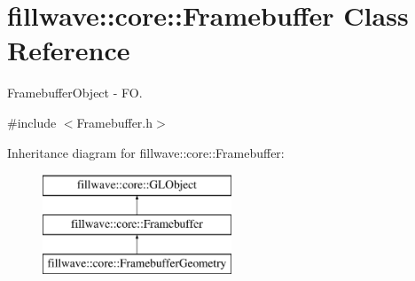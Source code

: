 \hypertarget{classfillwave_1_1core_1_1Framebuffer}{}\section{fillwave\+:\+:core\+:\+:Framebuffer Class Reference}
\label{classfillwave_1_1core_1_1Framebuffer}


Framebuffer\+Object -\/ F\+O.  




{\ttfamily \#include $<$Framebuffer.\+h$>$}

Inheritance diagram for fillwave\+:\+:core\+:\+:Framebuffer\+:\begin{figure}[H]
\begin{center}
\leavevmode
\includegraphics[height=3.000000cm]{classfillwave_1_1core_1_1Framebuffer}
\end{center}
\end{figure}
